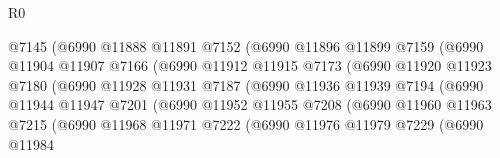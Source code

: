 \begin{lexlean}{R0}
\begin{coremodule}
                                @7145
                                (@6990
                                  @11888
                                  @11891
                                  @7152
                                  (@6990
                                    @11896
                                    @11899
                                    @7159
                                    (@6990
                                      @11904
                                      @11907
                                      @7166
                                      (@6990
                                        @11912
                                        @11915
                                        @7173
                                        (@6990
                                          @11920
                                          @11923
                                          @7180
                                          (@6990
                                            @11928
                                            @11931
                                            @7187
                                            (@6990
                                              @11936
                                              @11939
                                              @7194
                                              (@6990
                                                @11944
                                                @11947
                                                @7201
                                                (@6990
                                                  @11952
                                                  @11955
                                                  @7208
                                                  (@6990
                                                    @11960
                                                    @11963
                                                    @7215
                                                    (@6990
                                                      @11968
                                                      @11971
                                                      @7222
                                                      (@6990
                                                        @11976
                                                        @11979
                                                        @7229
                                                        (@6990
                                                          @11984

\end{coremodule}
\end{lexlean}
